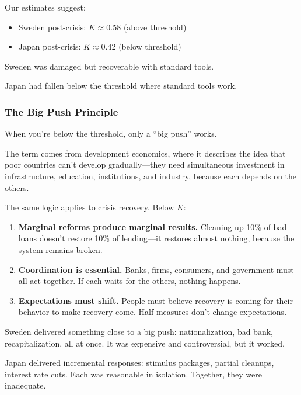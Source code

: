Our estimates suggest:
\begin{itemize}
    \item Sweden post-crisis: $K \approx 0.58$ (above threshold)
    \item Japan post-crisis: $K \approx 0.42$ (below threshold)
\end{itemize}

Sweden was damaged but recoverable with standard tools.

Japan had fallen below the threshold where standard tools work.

\subsubsection{The Big Push Principle}

When you're below the threshold, only a ``big push'' works.

The term comes from development economics, where it describes the idea 
that poor countries can't develop gradually---they need simultaneous 
investment in infrastructure, education, institutions, and industry, 
because each depends on the others.

The same logic applies to crisis recovery. Below $\underline{K}$:

\begin{enumerate}
    \item \textbf{Marginal reforms produce marginal results.} Cleaning up 
    10\% of bad loans doesn't restore 10\% of lending---it restores almost nothing, 
    because the system remains broken.
    
    \item \textbf{Coordination is essential.} Banks, firms, consumers, and 
    government must all act together. If each waits for the others, nothing happens.
    
    \item \textbf{Expectations must shift.} People must believe recovery is 
    coming for their behavior to make recovery come. Half-measures don't 
    change expectations.
\end{enumerate}

Sweden delivered something close to a big push: nationalization, bad bank, 
recapitalization, all at once. It was expensive and controversial, but 
it worked.

Japan delivered incremental responses: stimulus packages, partial cleanups, 
interest rate cuts. Each was reasonable in isolation. Together, they were 
inadequate.

